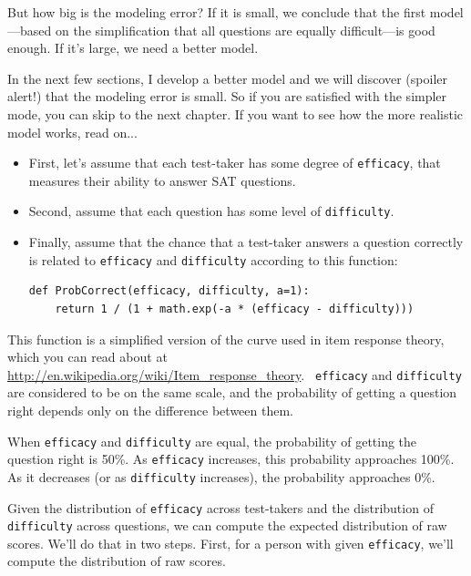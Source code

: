 \documentclass[12pt]{book}
\begin{document}
But how big is the modeling error?  If it is small, we conclude
that the first model---based on the simplification that all questions
are equally difficult---is good enough.  If it's large,
we need a better model.

In the next few sections, I develop a better model and we will
discover (spoiler alert!) that the modeling error is small.  So if
you are satisfied with the simpler mode, you can skip to the next
chapter.  If you want to see how the more realistic model works,
read on...

\begin{itemize}

\item First, let's assume that each test-taker has some 
  degree of {\tt efficacy}, that measures their
  ability to answer SAT questions.

\item Second, assume that each question has some level of
  {\tt difficulty}.

\item Finally, assume that the chance that a test-taker answers a
  question correctly is related to {\tt efficacy} and {\tt difficulty}
  according to this function:

\begin{verbatim}
def ProbCorrect(efficacy, difficulty, a=1):
    return 1 / (1 + math.exp(-a * (efficacy - difficulty)))
\end{verbatim}

\end{itemize}

This function is a simplified version of the curve used in item
response theory, which you can read about at
\url{http://en.wikipedia.org/wiki/Item_response_theory}.  {\tt
  efficacy} and {\tt difficulty} are considered to be on the same
scale, and the probability of getting a question right depends only on
the difference between them.

When {\tt efficacy} and {\tt difficulty} are equal, the
probability of getting the question right is 50\%.  As
{\tt efficacy} increases, this probability approaches 100\%.
As it decreases (or as {\tt difficulty} increases), the
probability approaches 0\%.

Given the distribution of {\tt efficacy} across test-takers
and the distribution of {\tt difficulty} across questions, we
can compute the expected distribution of raw scores.  We'll do that
in two steps.  First, for a person with given {\tt efficacy},
we'll compute the distribution of raw scores.
\end{document}
